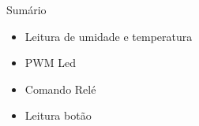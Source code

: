 \begin{frame}{Sumário}
    \begin{itemize}
        \item Leitura de umidade e temperatura
        \item PWM Led
        \item Comando Relé
        \item Leitura botão
    \end{itemize}
\end{frame}